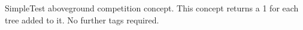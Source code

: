 Simple\+Test aboveground competition concept. This concept returns a 1 for each tree added to it. No further tags required. 